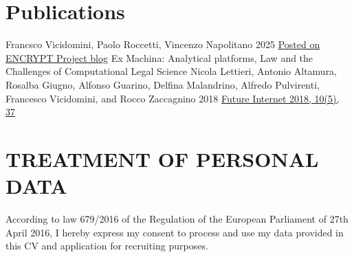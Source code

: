 \documentclass[%
               doublesided,
               paper=a4,
               fontsize=10pt
              ]{my-resume}
\begin{document}
\begin{comment}

\pagestyle{highlightmain}

\highlightbar{\hfill}
\mainbar{

    \section{Another section}
    
    This page uses the page style \texttt{highlightmain} which shows the highlight bar (gray) and the main part (white background) but omits the header. 
    The default page style is \texttt{headerhighlightmain} with all three elements.
    If you don't want header, nor highlight bar, use page style \texttt{\textbackslash pagestyle\{empty\}}.
    \medskip
    Neither main, nor highlight bar must be filled to make this template work.
    It is possible to use a page style with the highlight bar but leave it empty by setting an empty highlightbar \texttt{\textbackslash highlightbar\{\}}.

    \vspace{0.5em}
    \subsection{Subsection 1}
    Demonstrate subsections.
    
    \subsection{Subsection 2}
    Subsection are also bold face but a smaller font then section. They also omit the rule.
    

}

\makebody
\end{comment}

\clearpage
\pagestyle{empty}

\section{Publications}
\pubforcefullwidth
{}
{Francsco Vicidomini, Paolo Roccetti, Vincenzo Napolitano}
{2025}
{\href{https://encrypt-project.eu/communication/encrypt-blog/}{Posted on ENCRYPT Project blog}}
{}
\publication
	{Ex Machina: Analytical platforms, Law and the Challenges of Computational Legal Science} %
	{Nicola Lettieri, Antonio Altamura, Rosalba Giugno, Alfonso Guarino, Delfina Malandrino, Alfredo Pulvirenti, Francesco Vicidomini, and Rocco Zaccagnino} %
	{2018} %
	{\href{https://www.mdpi.com/1999-5903/10/5/37}{Future Internet 2018, 10(5), 37}} %
	{} %
\section{TREATMENT OF PERSONAL DATA}
According to law 679/2016 of the Regulation of the European Parliament of 27th April 2016, I hereby express my consent to process and use my data provided in this CV and application for recruiting purposes.
\end{document}
